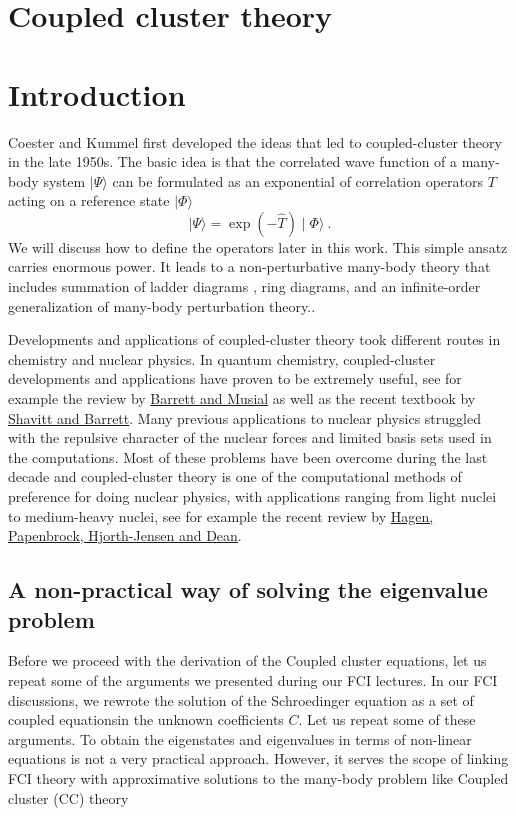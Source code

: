 \section{Coupled cluster theory}
\section{Introduction}
Coester and Kummel first developed the ideas that led to coupled-cluster
theory in the late 1950s. The basic idea is that the correlated wave function
of a many-body system $\mid\Psi\rangle$
can be formulated as an exponential of correlation
operators $T$ acting on a reference state $\mid\Phi\rangle$
\[
\mid\Psi\rangle = \exp\left(-\hat{T}\right)\mid\Phi\rangle\ .
\]
We will discuss how to define the operators later in this work. This simple
ansatz carries enormous power. It leads to a non-perturbative many-body
theory that includes summation of ladder diagrams , ring
diagrams, and an infinite-order
generalization of many-body perturbation theory..

Developments and applications
of coupled-cluster theory took different routes in chemistry
and nuclear physics. In quantum chemistry,
coupled-cluster developments
and applications have proven to be extremely useful, see for example the review by \href{{http://journals.aps.org/rmp/abstract/10.1103/RevModPhys.79.291}}{Barrett and Musial} as well as the recent 
textbook by \href{{http://www.cambridge.org/fr/academic/subjects/chemistry/physical-chemistry/many-body-methods-chemistry-and-physics-mbpt-and-coupled-cluster-theory?format=HB}}{Shavitt and Barrett}.  Many previous applications to nuclear physics struggled with the repulsive character of the nuclear forces and limited basis sets used in the computations. Most of these problems have been overcome during the last decade and coupled-cluster
theory is one of the computational methods of preference for doing nuclear physics, with applications ranging from light nuclei to medium-heavy nuclei,
see for example the recent review by \href{{http://iopscience.iop.org/0034-4885/77/9/096302}}{Hagen, Papenbrock, Hjorth-Jensen and Dean}. 


\subsection{A non-practical way of solving the eigenvalue problem}

Before we proceed with the derivation of the Coupled cluster equations, let us repeat some of the arguments we presented during our FCI lectures. 
In our FCI discussions, we rewrote the solution of the Schroedinger equation as a set of coupled equationsin the unknown coefficients $C$. Let us repeat some of these arguments.
To obtain the eigenstates and eigenvalues in terms of non-linear equations is not a very practical approach. However, it serves the scope of linking FCI theory with approximative solutions to the many-body problem
like Coupled cluster (CC) theory 

